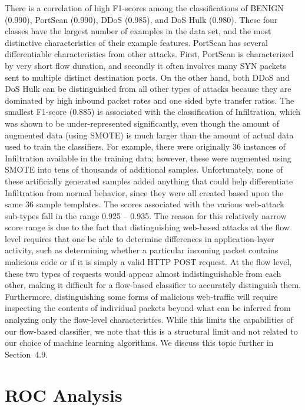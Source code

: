 There is a correlation of high F1-scores among the classifications of BENIGN (0.990), PortScan (0.990), DDoS (0.985), and DoS Hulk (0.980). These four classes have the largest number of examples in the data set, and the most distinctive characteristics of their example features. PortScan has several differentiable characteristics from other attacks. First, PortScan is characterized by very short flow duration, and secondly it often involves many SYN packets sent to multiple distinct destination ports. On the other hand, both DDoS and DoS Hulk can be distinguished from all other types of attacks because they are dominated by high inbound packet rates and one sided byte transfer ratios. The smallest F1-score (0.885) is associated with the classification of Infiltration, which was shown to be under-represented significantly, even though the amount of augmented data (using SMOTE) is much larger than the amount of actual data used to train the classifiers. For example, there were originally 36 instances of Infiltration available in the training data; however, these were augmented using SMOTE into tens of thousands of additional samples. Unfortunately, none of these artificially generated samples added anything that could help differentiate Infiltration from normal behavior, since they were all created based upon the same 36 sample templates.
The scores associated with the various web-attack sub-types fall in the range 0.925 -- 0.935. The reason for this relatively narrow score range is due to the fact that distinguishing web-based attacks at the flow level requires that one be able to determine differences in application-layer activity, such as determining whether a particular incoming packet contains malicious code or if it is simply a valid HTTP POST request. At the flow level, these two types of requests would appear almost indistinguishable from each other, making it difficult for a flow-based classifier to accurately distinguish them. Furthermore, distinguishing some forms of malicious web-traffic will require inspecting the contents of individual packets beyond what can be inferred from analyzing only the flow-level characteristics. While this limits the capabilities of our flow-based classifier, we note that this is a structural limit and not related to our choice of machine learning algorithms. We discuss this topic further in Section~4.9.

\section{ROC Analysis}

